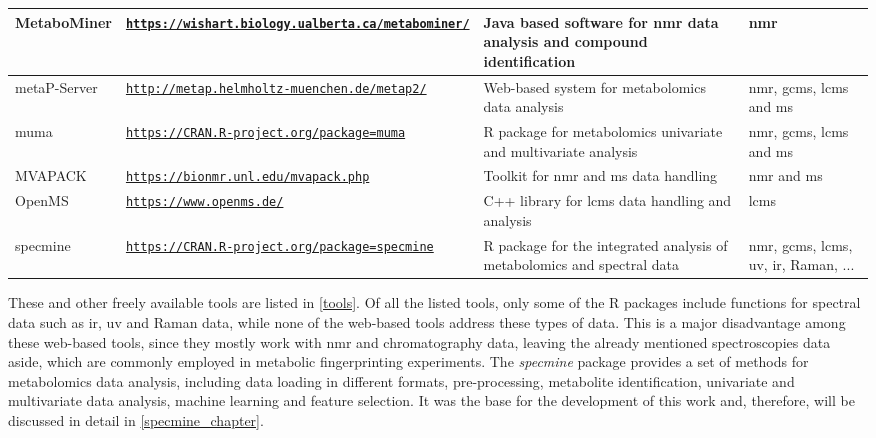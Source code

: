 \begin{table}[!ht]
\begin{scriptsize}
\begin{tabu}{|m{1.8cm}|m{5.2cm}|m{5cm}|m{2.4cm}|}
			\hline 
			MetaboMiner & \href{https://wishart.biology.ualberta.ca/metabominer/}{\nolinkurl{https://wishart.biology.ualberta.ca/metabominer/}} & Java based software for \gls{nmr} data analysis and compound identification & \gls{nmr} \\ 
			
			\hline 
			metaP-Server & \href{http://metap.helmholtz-muenchen.de/metap2/}{\nolinkurl{http://metap.helmholtz-muenchen.de/metap2/}} & Web-based system for metabolomics data analysis & \gls{nmr}, \gls{gcms}, \gls{lcms} and \gls{ms} \\ 
			
			\hline 
			muma & \href{https://CRAN.R-project.org/package=muma}{\nolinkurl{https://CRAN.R-project.org/package=muma}} & R package for metabolomics univariate and multivariate analysis & \gls{nmr}, \gls{gcms}, \gls{lcms} and \gls{ms} \\ 
			
			\hline 
			MVAPACK & \href{https://bionmr.unl.edu/mvapack.php}{\nolinkurl{https://bionmr.unl.edu/mvapack.php}} & Toolkit for \gls{nmr} and \gls{ms} data handling & \gls{nmr} and \gls{ms} \\ 
			
			\hline 
			OpenMS & \href{https://www.openms.de/}{\nolinkurl{https://www.openms.de/}} & C++ library for \gls{lcms} data handling and analysis & \gls{lcms} \\ 
			
			\hline 
			specmine & \href{https://CRAN.R-project.org/package=specmine}{\nolinkurl{https://CRAN.R-project.org/package=specmine}} & R package for the integrated analysis of metabolomics and spectral data & \gls{nmr}, \gls{gcms}, \gls{lcms}, \gls{uv}, \gls{ir}, Raman, ... \\ 
			
			\hline 		
		\end{tabu}
	\end{scriptsize}
\end{table}

These and other freely available tools are listed in \autoref{tools}. Of all the listed tools, only some of the R packages include functions for spectral data such as \gls{ir}, \gls{uv} and Raman data, while none of the web-based tools address these types of data. This is a major disadvantage among these web-based tools, since they mostly work with \gls{nmr} and chromatography data, leaving the already mentioned spectroscopies data aside, which are commonly employed in metabolic fingerprinting experiments. The \textit{specmine} package provides a set of methods for metabolomics data analysis, including data loading in different formats, pre-processing, metabolite identification, univariate and multivariate data analysis, machine learning and feature selection. It was the base for the development of this work and, therefore, will be discussed in detail in \autoref{specmine_chapter}.



